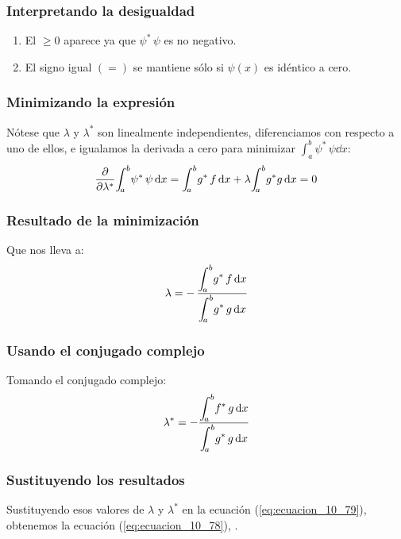 \documentclass[12pt]{beamer}
\begin{document}
\begin{frame}
\frametitle{Interpretando la desigualdad}
\begin{enumerate}[<+->]
\item El $\geq 0$ aparece ya que $\psi^{*} \, \psi$ es no negativo.
\item El signo igual $(=)$ se mantiene sólo si $\psi (x)$ es idéntico a cero.
\end{enumerate}
\end{frame}
\begin{frame}
\frametitle{Minimizando la expresión}
Nótese que $\lambda$ y $\lambda^{*}$ son linealmente independientes, \pause diferenciamos con respecto a uno de ellos, \pause e igualamos la derivada a cero para minimizar $\displaystyle \int_{a}^{b} \psi^{*} \, \psi \dd{x}$:
\pause
\begin{align*}
\pdv{\lambda^{*}} \scaleint{5ex}_{\bs a}^{b} \psi^{*} \, \psi \dd{x} = \scaleint{5ex}_{\bs a}^{b} g^{*} \, f \dd{x}  + \lambda \scaleint{5ex}_{\bs a}^{b} g^{*} g \dd{x} = 0
\end{align*}
\end{frame}
\begin{frame}
\frametitle{Resultado de la minimización}
Que nos lleva a:
\pause
\begin{align}
\lambda = - \, \dfrac{\displaystyle \scaleint{5ex}_{\bs a}^{b} g^{*} \, f \dd{x}}{\displaystyle \scaleint{5ex}_{\bs a}^{b} g^{*} \, g \dd{x}}
\label{eq:ecuacion_10_80a}
\end{align}
\end{frame}
\begin{frame}
\frametitle{Usando el conjugado complejo}
Tomando el conjugado complejo:
\pause
\begin{align}
\lambda^{*} = - \dfrac{\displaystyle \scaleint{5ex}_{\bs a}^{b} f^{*} \, g \dd{x}}{\displaystyle \scaleint{5ex}_{\bs a}^{b} g^{*} \, g \dd{x}}
\label{eq:ecuacion_80b}
\end{align}
\end{frame}
\begin{frame}
\frametitle{Sustituyendo los resultados}
Sustituyendo esos valores de $\lambda$ y $\lambda^{*}$ en la ecuación (\ref{eq:ecuacion_10_79}), \pause obtenemos la ecuación (\ref{eq:ecuacion_10_78}), \underline{}.
\end{frame}
\end{document}
